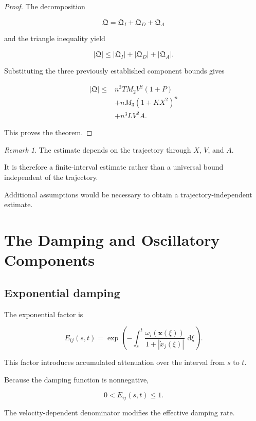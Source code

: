 \documentclass[12pt]{article}
\numberwithin{equation}{section}
\newcommand{\Q}{\mathfrak{Q}}
\newcommand{\dd}{\,\mathrm{d}}
\theoremstyle{definition}
\theoremstyle{remark}
\newtheorem{remark}[theorem]{Remark}
\begin{document}
\begin{proof}

The decomposition

\[
\Q=\Q_I+\Q_D+\Q_A
\]

and the triangle inequality yield

\[
|\Q|
\leq
|\Q_I|+|\Q_D|+|\Q_A|.
\]

Substituting the three previously
established component bounds gives

\[
\begin{aligned}
|\Q|
\leq{}&
n^3TM_2V^2(1+P)
\\
&+
nM_3(1+KX^2)^n
\\
&+
n^3LV^2A.
\end{aligned}
\]

This proves the theorem.

\end{proof}

\begin{remark}

The estimate depends on the trajectory
through \(X\), \(V\), and \(A\).

It is therefore a finite-interval estimate
rather than a universal bound independent
of the trajectory.

Additional assumptions would be necessary
to obtain a trajectory-independent estimate.

\end{remark}


\section{The Damping and Oscillatory Components}

\subsection{Exponential damping}

The exponential factor is

\[
E_{ij}(s,t)
=
\exp\left(
-\int_s^t
\frac{\omega_i(\mathbf{x}(\xi))}
{1+|\dot{x}_j(\xi)|}
\,\dd\xi
\right).
\]

This factor introduces accumulated attenuation
over the interval from \(s\) to \(t\).

Because the damping function is nonnegative,

\[
0<E_{ij}(s,t)\leq1.
\]

The velocity-dependent denominator modifies
the effective damping rate.
\end{document}
